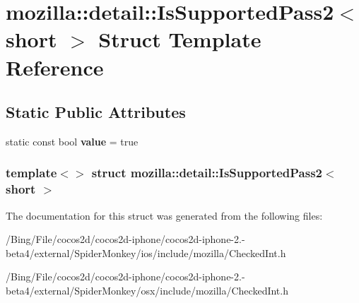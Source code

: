 \hypertarget{structmozilla_1_1detail_1_1_is_supported_pass2_3_01short_01_4}{\section{mozilla\-:\-:detail\-:\-:Is\-Supported\-Pass2$<$ short $>$ Struct Template Reference}
\label{structmozilla_1_1detail_1_1_is_supported_pass2_3_01short_01_4}
}
\subsection*{Static Public Attributes}
\begin{DoxyCompactItemize}
\item 
\hypertarget{structmozilla_1_1detail_1_1_is_supported_pass2_3_01short_01_4_adf6ef1d9f541a04666b3dab67a8a1d0e}{static const bool {\bfseries value} = true}\label{structmozilla_1_1detail_1_1_is_supported_pass2_3_01short_01_4_adf6ef1d9f541a04666b3dab67a8a1d0e}

\end{DoxyCompactItemize}
\subsubsection*{template$<$$>$ struct mozilla\-::detail\-::\-Is\-Supported\-Pass2$<$ short $>$}



The documentation for this struct was generated from the following files\-:\begin{DoxyCompactItemize}
\item 
/\-Bing/\-File/cocos2d/cocos2d-\/iphone/cocos2d-\/iphone-\/2.-\/beta4/external/\-Spider\-Monkey/ios/include/mozilla/Checked\-Int.\-h\item 
/\-Bing/\-File/cocos2d/cocos2d-\/iphone/cocos2d-\/iphone-\/2.-\/beta4/external/\-Spider\-Monkey/osx/include/mozilla/Checked\-Int.\-h\end{DoxyCompactItemize}
